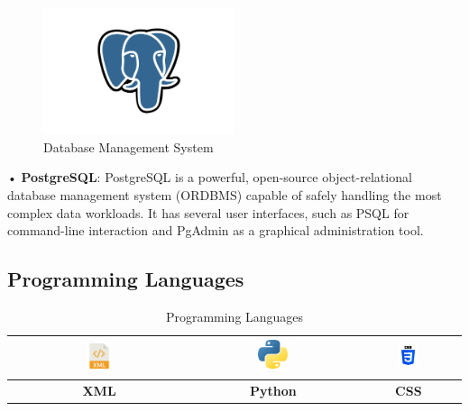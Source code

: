 \begin{figure}[h]
    \centering
    \includegraphics[width=0.5\textwidth]{media/PostgreSQL-Logo.wine.png}
    \caption{Database Management System}
    \label{fig:dbms}
\end{figure}

• \textbf{PostgreSQL}\cite{postgresql}: PostgreSQL is a powerful, open-source object-relational database management system (ORDBMS) capable of safely handling the most complex data workloads. It has several user interfaces, such as PSQL for command-line interaction and PgAdmin as a graphical administration tool.




\subsection{Programming Languages}



\begin{table}[h]
    \centering
    
    \begin{tabular}{|c|c|c|}
        \hline
        \includegraphics[width=0.15\textwidth]{media/xml_logo.png} &
        \includegraphics[width=0.2\textwidth]{media/python_logo.png} &
        \includegraphics[width=0.2\textwidth]{media/css-3.png} \\
        \hline
        \textbf{\cellcolor{gray!50}XML} & \textbf{\cellcolor{gray!50}Python} & \textbf{\cellcolor{gray!50}CSS} \\
        \hline
    \end{tabular}
    \caption{Programming Languages}
    \label{tab:programming-languages}
\end{table}
\newpage

